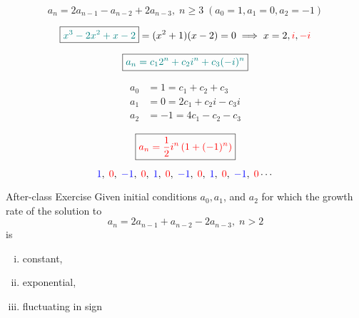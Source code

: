 \begin{frame}{}
  \[
    a_n = 2a_{n-1} - a_{n-2} + 2a_{n-3},\; n \ge 3 \; (a_0 = 1, a_1 = 0, a_2 = -1)
  \]

  \pause
  \[
    \boxed{\textcolor{teal}{x^3 - 2x^2 + x - 2}} = (x^2 + 1) (x-2) = 0 \implies x = 2, \textcolor{red}{i}, \textcolor{red}{-i}
  \]

  \pause
  \[
    \boxed{\textcolor{teal}{a_n = c_1 2^n + c_2 i^n + c_3 (-i)^n}}
  \]

  \pause
  \vspace{-0.50cm}
  \begin{align*}
    a_0 &= 1 = c_1 + c_2 + c_3 \\
    a_1 &= 0 = 2c_1 + c_2 i - c_3 i \\
    a_2 &= -1 = 4c_1 - c_2 - c_3
  \end{align*}

  \pause
  \vspace{-0.30cm}
  \[
    \boxed{\textcolor{red}{a_n = \frac{1}{2} i^{n} \left(1 + (-1)^n \right)}}
  \]

  \pause
  \[
    \textcolor{blue}{1},\; \textcolor{red}{0},\; \textcolor{blue}{-1},\; \textcolor{red}{0},\; \textcolor{blue}{1},\; \textcolor{red}{0},\; \textcolor{blue}{-1},\; \textcolor{red}{0},\;
    \textcolor{blue}{1},\; \textcolor{red}{0},\; \textcolor{blue}{-1},\; \textcolor{red}{0} \cdots
  \]
\end{frame}

\begin{frame}{}
  \begin{exampleblock}{After-class Exercise}
    Given initial conditions $a_0, a_1$, and $a_2$ for which the growth rate of the solution to
    \[
      a_n = 2a_{n-1} + a_{n-2} - 2a_{n-3},\; n > 2
    \]
    is 
    \begin{enumerate}[(i)]
      \item constant,
      \item exponential,
      \item fluctuating in sign
    \end{enumerate}
  \end{exampleblock}

  \begin{columns}
    \pause
  \end{columns}
\end{frame}

